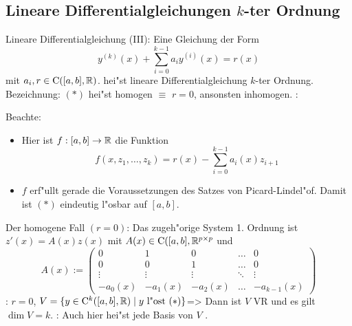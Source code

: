 \subsection{Lineare Differentialgleichungen $k$-ter Ordnung}
 Lineare Differentialgleichung (III):{
%
%
%
%
%
%
  Eine Gleichung der Form
  \begin{equation*}
    \tag{*} y^{(k)}(x)+\sum_{i=0}^{k-1}a_iy^{(i)}(x)=r(x)
    \end{equation*}
  mit $a_i,r\in{\rm C}([a,b],\mathbb R)$.
  hei"st lineare Differentialgleichung $k$-ter Ordnung.
  Bezeichnung: $(*)$ hei"st homogen $\equiv$ $r=0$, ansonsten
  inhomogen.
  }
\remark:{
  Beachte:
  \begin{itemize}
    \item Hier ist $f:[a,b]\to\mathbb R$ die Funktion
      \[f(x,z_1,\ldots,z_k)=r(x)-\sum_{i=0}^{k-1}a_i(x)z_{i+1}
        \]
    \item $f$ erf"ullt gerade die Voraussetzungen des Satzes von
      Picard-Lindel"of. Damit ist $(*)$ eindeutig l"osbar auf $[a,b]$.
    \end{itemize}
  }
\remark Der homogene Fall $(r=0)$:{
  Das zugeh"orige System 1. Ordnung ist $z'(x)=A(x)z(x)$ mit 
  $A(x)\in{\rm C}([a,b],\mathbb R^{p\times p}$ und
  \[A(x):=\begin{pmatrix}
      0 & 1 & 0 & \dots & 0 \\
      0 & 0 & 1 & \dots & 0 \\
      \vdots & \vdots & \vdots & \ddots & \vdots \\
      -a_0(x) & -a_1(x) & -a_2(x) & \dots & -a_{k-1}(x) 
      \end{pmatrix}
    \]
  }
\theorem:
  $r=0$, $V=\{y\in{\rm C}^k([a,b],\mathbb R)\mid y \text{ l"ost } (*)\}$=>{
  Dann ist $V$ VR und es gilt $\dim V=k$.
  }
\remark:{
  Auch hier hei"st jede Basis von $V$ .
  }
